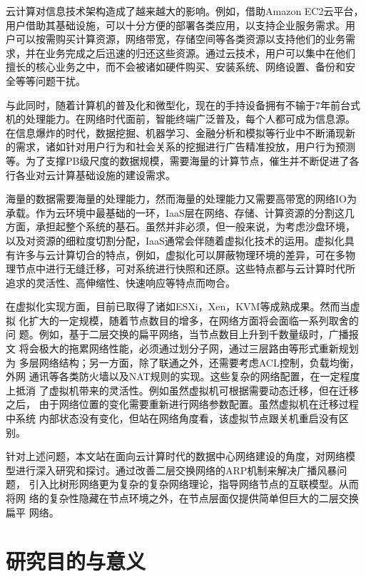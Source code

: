 云计算对信息技术架构造成了越来越大的影响。例如，借助Amazon EC2云平台，
用户借助其基础设施，可以十分方便的部署各类应用，以支持企业服务需求。用
户可以按需购买计算资源，网络带宽，存储空间等各类资源以支持他们的业务需
求，并在业务完成之后迅速的归还这些资源。通过云技术，用户可以集中在他们
擅长的核心业务之中，而不会被诸如硬件购买、安装系统、网络设置、备份和安
全等等问题干扰。

与此同时，随着计算机的普及化和微型化，现在的手持设备拥有不输于7年前台式
机的处理能力。在网络时代面前，智能终端广泛普及，每个人都可成为信息源。
在信息爆炸的时代，数据挖掘、机器学习、金融分析和模拟等行业中不断涌现新
的需求，诸如针对用户行为和社会关系的挖掘进行广告精准投放，用户行为预测
等。为了支撑PB级尺度的数据规模，需要海量的计算节点，催生并不断促进了各
行各业对云计算基础设施的建设需求。

海量的数据需要海量的处理能力，然而海量的处理能力又需要高带宽的网络IO为
承载。作为云环境中最基础的一环，IaaS层在网络、存储、计算资源的分割这几
方面，承担起整个系统的基石。虽然并非必须，但一般来说，为考虑沙盘环境，
以及对资源的细粒度切割分配，IaaS通常会伴随着虚拟化技术的运用。虚拟化具
有许多与云计算切合的特点，例如，虚拟化可以屏蔽物理环境的差异，可在多物
理节点中进行无缝迁移，可对系统进行快照和还原。这些特点都与云计算时代所
追求的灵活性、高伸缩性、快速响应等特点而吻合。

在虚拟化实现方面，目前已取得了诸如ESXi，Xen，KVM等成熟成果。然而当虚拟
化扩大的一定规模，随着节点数目的增多，在网络方面将会面临一系列取舍的问
题。例如，基于二层交换的扁平网络，当节点数目上升到千数量级时，广播报文
将会极大的拖累网络性能，必须通过划分子网，通过三层路由等形式重新规划为
多层网络结构；另一方面，除了联通之外，还需要考虑ACL控制，负载均衡，外网
通讯等各类防火墙以及NAT规则的实现。这些复杂的网络配置，在一定程度上抵消
了虚拟机带来的灵活性。例如虽然虚拟机可根据需要动态迁移，但在迁移之后，
由于网络位置的变化需要重新进行网络参数配置。虽然虚拟机在迁移过程中系统
内部状态没有变化，但站在网络角度看，该虚拟节点跟关机重启没有区别。

针对上述问题，本文站在面向云计算时代的数据中心网络建设的角度，对网络模
型进行深入研究和探讨。通过改善二层交换网络的ARP机制来解决广播风暴问题，
引入比树形网络更为复杂的复杂网络理论，指导网络节点的互联模型。从而将网
络的复杂性隐藏在节点环境之外，在节点层面仅提供简单但巨大的二层交换扁平
网络。

\section{研究目的与意义}

